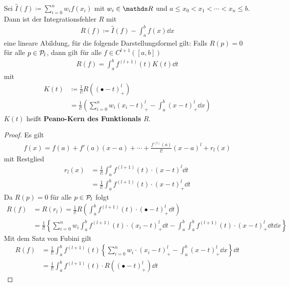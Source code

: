 \begin{Satze}
  Sei $\hat{I}(f)\coloneqq \sum_{i=0}^n w_if(x_i)$ mit $w_i\in\R$ und
  $a\leq x_0<x_1<\dotsb <x_n\leq b$.
  Dann ist der Integrationsfehler $R$ mit 
  \begin{gather}
    R(f) \coloneqq \hat{I}(f) - \int_a^b f(x) \dd x
    \label{VII.2.5}
  \end{gather}
  eine lineare Abildung, für die folgende Darstellungsformel gilt:
  Falls $R(p)=0$ für alle $p\in\mathcal{P}_l$, dann gilt 
  für alle $f\in C^{l+1}([a,b])$
  \begin{gather}
    R(f) = \int_a^bf^{(l+1)}(t) K(t) \dd t
    \label{VII.2.6}
  \end{gather}
  mit 
  \begin{align}\nonumber
    K(t) &\coloneqq \frac{1}{l!}
           R\left( 
           (\bullet -t)_+^l
           \right)\\
         &= \frac{1}{l!}\left( 
           \sum_{i=0}^n w_i(x_i-t)_+^l-\int_a^b(x-t)_+^l\dd x  
           \right)
           \label{VII.2.7}
  \end{align}
  $K(t)$ heißt \textbf{Peano-Kern des Funktionals
    $R$}.
  \begin{proof}
    Es gilt
    \begin{gather*}
      f(x) = f(a) + f'(a)(x-a) +\dotsb + \frac{f^{(l)}(a)}{l!}(x-a)^l + r_l(x)
    \end{gather*}
    mit Restglied 
    \begin{align*}
      r_l(x) &= \frac{1}{l!} \int_a^xf^{(l+1)} (t)\cdot (x-t)^l \dd t\\
             &= \frac{1}{l!} \int_a^bf^{(l+1)} (t)\cdot (x-t)_+^l \dd t
    \end{align*}
    Da $R(p)=0$ für alle $p\in\mathcal{P}_l$ folgt
    \begin{align*}
      R(f) &= R(r_l)
             = \frac{1}{l!} R\left(\int_a^bf^{(l+1)} (t)\cdot(\bullet-t)_+^l
             \dd t\right)\\
           &=\frac{1}{l!}\left\{ \sum_{i=0}^n w_i \int_a^b f^{(l+1)}(t)
             \cdot (x_i-t)_+^l\dd t  
             - \int_a^b\int_a^b  f^{(l+1)}(t) \cdot (x-t)_+^l\dd t\dd x  \right\}
    \end{align*}
    Mit dem Satz von Fubini gilt
    \begin{align*}
      R(f) &= \frac{1}{l!}\int_a^bf^{(l+1)}(t) 
             \left\{ 
             \sum_{i=0}^n w_i  \cdot (x_i-t)_+^l  
             - \int_a^b(x-t)_+^l\dd x  \right\}
             \dd t\\
           &= \frac{1}{l!} \int_a^bf^{(l+1)}(t) 
             \cdot R\left( (\bullet -t)_+^l\right) \dd t    
    \end{align*}
  \end{proof}
\end{Satze}

